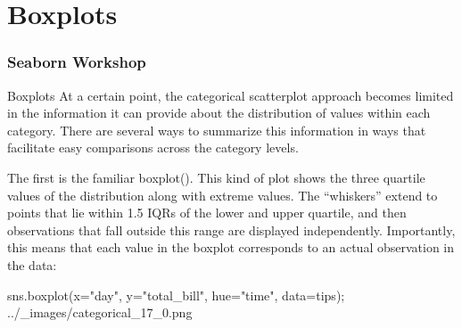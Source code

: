 \section{Boxplots}
\begin{frame}[fragile]
\frametitle{Seaborn Workshop}
\large
Boxplots
At a certain point, the categorical scatterplot approach becomes limited in the information it can provide about the distribution of values within each category. There are several ways to summarize this information in ways that facilitate easy comparisons across the category levels.

The first is the familiar boxplot(). This kind of plot shows the three quartile values of the distribution along with extreme values. The “whiskers” extend to points that lie within 1.5 IQRs of the lower and upper quartile, and then observations that fall outside this range are displayed independently. Importantly, this means that each value in the boxplot corresponds to an actual observation in the data:

sns.boxplot(x="day", y="total_bill", hue="time", data=tips);
../_images/categorical_17_0.png
\end{frame}
